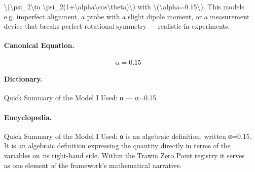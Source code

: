 \textbackslash{}(\textbackslash{}psi\_2\textbackslash{}to \textbackslash{}psi\_2(1+\textbackslash{}alpha\textbackslash{}cos\textbackslash{}theta)\textbackslash{}) with \textbackslash{}(\textbackslash{}alpha=0.15\textbackslash{}). This models e.g. imperfect alignment, a probe with a slight dipole moment, or a measurement device that breaks perfect rotational symmetry — realistic in experiments.

\paragraph{Canonical Equation.}
\[
\alpha=0.15
\]

\paragraph{Dictionary.}
Quick Summary of the Model I Used: α — α=0.15

\paragraph{Encyclopedia.}
Quick Summary of the Model I Used: α is an algebraic definition, written α=0.15. It is an algebraic definition expressing the quantity directly in terms of the variables on its right-hand side. Within the Trawin Zero Point registry it serves as one element of the framework's mathematical narrative.
